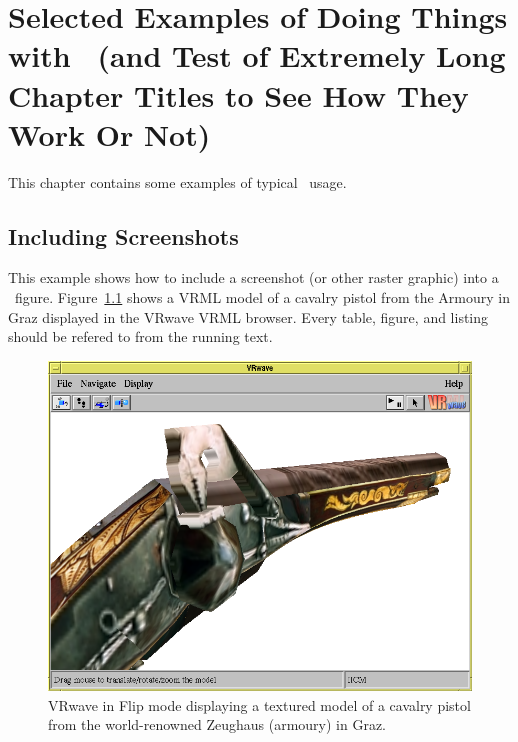 %
%
% 
% 
% 

\chapter{Selected Examples of Doing Things with \LaTeXe\
(and Test of Extremely
Long Chapter Titles to See How They Work Or Not)
}

\label{chap:SelectedExamples}


This chapter contains some examples of typical \LaTeXe\
usage.




\section{Including Screenshots}

This example shows how to include a screenshot (or other raster
graphic) into a \LaTeXe\ figure. Figure~\ref{fig:Pistol} shows a VRML
model of a cavalry pistol from the Armoury in Graz displayed in the
VRwave VRML browser. Every table, figure, and listing should be
refered to from the running text.

\begin{figure}[tp]
\centering
\includegraphics[keepaspectratio,width=\linewidth,height=\halfh]
{images/pist.png}

\caption[VRwave in Flip Mode]
{%
VRwave in Flip mode displaying a textured model of a cavalry pistol
from the world-renowned Zeughaus (armoury) in Graz.
}
\label{fig:Pistol}
\end{figure}

